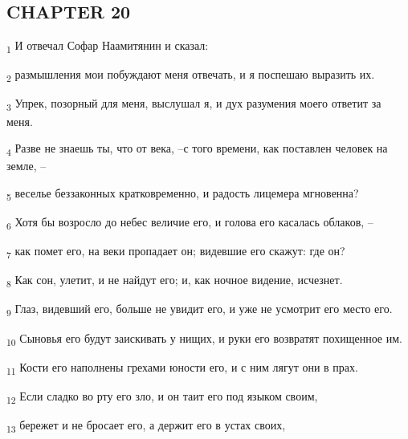 \subsection{CHAPTER 20}
\begin{tcolorbox}
\textsubscript{1} И отвечал Софар Наамитянин и сказал:
\end{tcolorbox}
\begin{tcolorbox}
\textsubscript{2} размышления мои побуждают меня отвечать, и я поспешаю выразить их.
\end{tcolorbox}
\begin{tcolorbox}
\textsubscript{3} Упрек, позорный для меня, выслушал я, и дух разумения моего ответит за меня.
\end{tcolorbox}
\begin{tcolorbox}
\textsubscript{4} Разве не знаешь ты, что от века, --с того времени, как поставлен человек на земле, --
\end{tcolorbox}
\begin{tcolorbox}
\textsubscript{5} веселье беззаконных кратковременно, и радость лицемера мгновенна?
\end{tcolorbox}
\begin{tcolorbox}
\textsubscript{6} Хотя бы возросло до небес величие его, и голова его касалась облаков, --
\end{tcolorbox}
\begin{tcolorbox}
\textsubscript{7} как помет его, на веки пропадает он; видевшие его скажут: где он?
\end{tcolorbox}
\begin{tcolorbox}
\textsubscript{8} Как сон, улетит, и не найдут его; и, как ночное видение, исчезнет.
\end{tcolorbox}
\begin{tcolorbox}
\textsubscript{9} Глаз, видевший его, больше не увидит его, и уже не усмотрит его место его.
\end{tcolorbox}
\begin{tcolorbox}
\textsubscript{10} Сыновья его будут заискивать у нищих, и руки его возвратят похищенное им.
\end{tcolorbox}
\begin{tcolorbox}
\textsubscript{11} Кости его наполнены грехами юности его, и с ним лягут они в прах.
\end{tcolorbox}
\begin{tcolorbox}
\textsubscript{12} Если сладко во рту его зло, и он таит его под языком своим,
\end{tcolorbox}
\begin{tcolorbox}
\textsubscript{13} бережет и не бросает его, а держит его в устах своих,
\end{tcolorbox}
